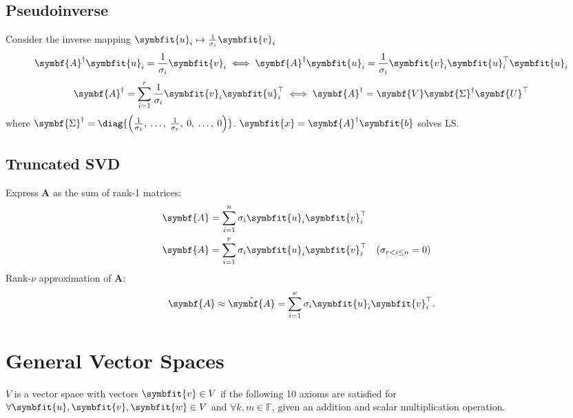 \documentclass{article}
\begin{document}
\begin{multicols*}{3}
    \subsection{Pseudoinverse}
    Consider the inverse mapping \(\symbfit{u}_i \mapsto \frac{1}{\sigma_i} \symbfit{v}_i\)
    \begin{equation*}
        \symbf{A}^\dagger \symbfit{u}_i = \frac{1}{\sigma_i} \symbfit{v}_i
        \iff
        \symbf{A}^\dagger \symbfit{u}_i = \frac{1}{\sigma_i} \symbfit{v}_i \symbfit{u}^\top_i \symbfit{u}_i
    \end{equation*}
    \begin{equation*}
        \symbf{A}^\dagger = \sum_{i = 1}^r \frac{1}{\sigma_i} \symbfit{v}_i \symbfit{u}^\top_i
        \iff
        \symbf{A}^\dagger = \symbf{V} \symbf{\Sigma}^\dagger \symbf{U}^\top
    \end{equation*}
    where \(\symbf{\Sigma}^\dagger = \diag{\left( \frac{1}{\sigma_1},\: \dots,\: \frac{1}{\sigma_r},\: 0,\: \dots,\: 0 \right)}\).
    \(\symbfit{x} = \symbf{A}^\dagger \symbfit{b}\) solves LS\@.
    \subsection{Truncated SVD}
    Express \(\symbf{A}\) as the sum of rank-1 matrices:
    \begin{align*}
        \symbf{A} & = \sum_{i = 1}^n \sigma_i \symbfit{u}_i \symbfit{v}^\top_i                                  \\
        \symbf{A} & = \sum_{i = 1}^r \sigma_i \symbfit{u}_i \symbfit{v}^\top_i &  & (\sigma_{r < i \leq n} = 0)
    \end{align*}
    Rank-\(\nu\) approximation of \(\symbf{A}\):
    \begin{equation*}
        \symbf{A} \approx \tilde{\symbf{A}} = \sum_{i = 1}^\nu \sigma_i \symbfit{u}_i \symbfit{v}^\top_i.
    \end{equation*}
    \section{General Vector Spaces}
    \(V\) is a vector space with vectors \(\symbfit{v} \in V\) if the following 10 axioms are satisfied
    for \(\forall \symbfit{u}, \symbfit{v}, \symbfit{w} \in V\) and \(\forall k, m \in \mathbb{F}\),
    given an addition and scalar multiplication operation.


\end{multicols*}
\end{document}
